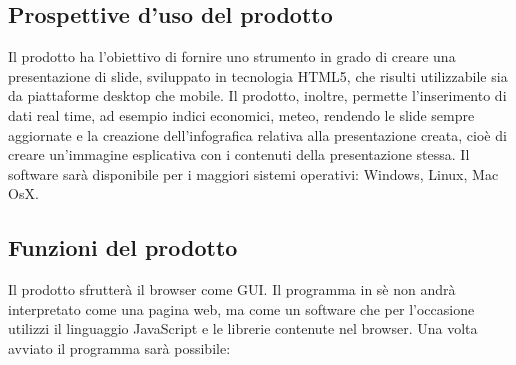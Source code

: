 \subsection{Prospettive d'uso del prodotto}
Il prodotto ha l'obiettivo di fornire uno strumento in grado di creare una presentazione di \gls{slide}, sviluppato in tecnologia \gls{HTML5}, che risulti utilizzabile sia da piattaforme desktop che mobile. Il prodotto, inoltre, permette l'inserimento di dati \gls{real time}, ad esempio indici economici, meteo, rendendo le \gls{slide} sempre aggiornate e la creazione dell'\gls{infografica} relativa alla presentazione creata, cioè di creare un'immagine esplicativa con i contenuti della presentazione stessa. Il software sarà disponibile per i maggiori sistemi operativi: \gls{Windows}, \gls{Linux}, \gls{Mac OsX}.

\subsection{Funzioni del prodotto}
Il prodotto sfrutterà il \gls{browser} come \gls{GUI}. Il programma in sè non andrà interpretato come una pagina web, ma come un software che per l'occasione utilizzi il linguaggio \gls{JavaScript} e le librerie contenute nel \gls{browser}.
Una volta avviato il programma sarà possibile:
